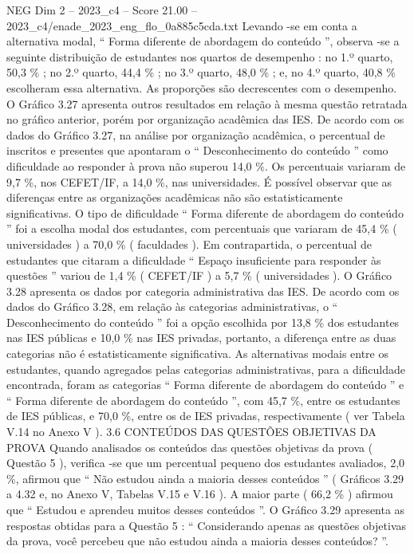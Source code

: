 \begin{textsample}{NEG Dim 2 – 2023\_c4 – Score 21.00 – 2023\_c4/enade\_2023\_eng\_flo\_0a885c5cda.txt}
Levando -se em conta a alternativa modal, “ Forma diferente de abordagem do conteúdo ”, observa -se a seguinte distribuição de estudantes nos quartos de desempenho : no 1.º quarto, 50,3 \% ; no 2.º quarto, 44,4 \% ; no 3.º quarto, 48,0 \% ; e, no 4.º quarto, 40,8 \% escolheram essa alternativa.
As proporções são decrescentes com o desempenho.
O Gráfico 3.27 apresenta outros resultados em relação à mesma questão retratada no gráfico anterior, porém por organização acadêmica das IES.
De acordo com os dados do Gráfico 3.27, na análise por organização acadêmica, o percentual de inscritos e presentes que apontaram o “ Desconhecimento do conteúdo ” como dificuldade ao responder à prova não superou 14,0 \%.
Os percentuais variaram de 9,7 \%, nos CEFET/IF, a 14,0 \%, nas universidades.
É possível observar que as diferenças entre as organizações acadêmicas não são estatisticamente significativas.
O tipo de dificuldade “ Forma diferente de abordagem do conteúdo ” foi a escolha modal dos estudantes, com percentuais que variaram de 45,4 \% ( universidades ) a 70,0 \% ( faculdades ).
Em contrapartida, o percentual de estudantes que citaram a dificuldade “ Espaço insuficiente para responder às questões ” variou de 1,4 \% ( CEFET/IF ) a 5,7 \% ( universidades ).
O Gráfico 3.28 apresenta os dados por categoria administrativa das IES.
De acordo com os dados do Gráfico 3.28, em relação às categorias administrativas, o “ Desconhecimento do conteúdo ” foi a opção escolhida por 13,8 \% dos estudantes nas IES públicas e 10,0 \% nas IES privadas, portanto, a diferença entre as duas categorias não é estatisticamente significativa.
As alternativas modais entre os estudantes, quando agregados pelas categorias administrativas, para a dificuldade encontrada, foram as categorias “ Forma diferente de abordagem do conteúdo ” e “ Forma diferente de abordagem do conteúdo ”, com 45,7 \%, entre os estudantes de IES públicas, e 70,0 \%, entre os de IES privadas, respectivamente ( ver Tabela V.14 no Anexo V ). 3.6 CONTEÚDOS DAS QUESTÕES OBJETIVAS DA PROVA Quando analisados os conteúdos das questões objetivas da prova ( Questão 5 ), verifica -se que um percentual pequeno dos estudantes avaliados, 2,0 \%, afirmou que “ Não estudou ainda a maioria desses conteúdos ” ( Gráficos 3.29 a 4.32 e, no Anexo V, Tabelas V.15 e V.16 ).
A maior parte ( 66,2 \% ) afirmou que “ Estudou e aprendeu muitos desses conteúdos ”.
O Gráfico 3.29 apresenta as respostas obtidas para a Questão 5 : “ Considerando apenas as questões objetivas da prova, você percebeu que não estudou ainda a maioria desses conteúdos? ”.

\end{textsample}
